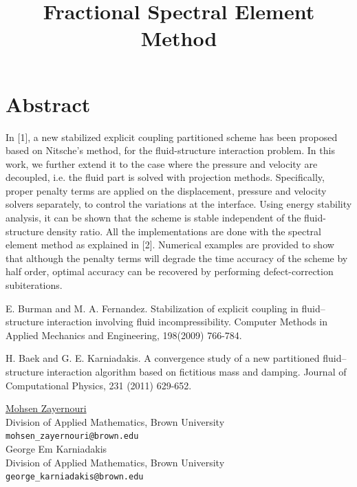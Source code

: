 \documentclass[article, A4, 11pt]{llncs}%
\begin{document}
\section*{Abstract}
In [1], a new stabilized explicit coupling partitioned scheme has been proposed based on Nitsche's method, for the fluid-structure interaction problem. In this work, we further extend it to the case where the pressure and velocity are decoupled, i.e. the fluid part is solved with projection methods. Specifically, proper penalty terms are applied on the displacement, pressure and velocity solvers separately, to control the variations at the interface. Using energy stability analysis, it can be shown that the scheme is stable independent of the fluid-structure density ratio. All the implementations are done with the spectral element method as explained in [2]. Numerical examples are provided to show that although the penalty terms will degrade the time accuracy of the scheme by half order, optimal accuracy can be recovered by performing defect-correction subiterations.


\begin{thebibliography}{10}
{\sc E. Burman and M. A. Fernandez}. {Stabilization of explicit coupling in fluid–structure interaction involving fluid incompressibility}. Computer Methods in Applied Mechanics and Engineering, 198(2009) 766-784.

{\sc H. Baek and G. E. Karniadakis}. {A convergence study of a new partitioned fluid–structure interaction algorithm based on fictitious mass and damping}. Journal of Computational Physics, 231 (2011) 629-652.
\end{thebibliography} %

\title{Fractional Spectral Element Method}
 \author{} \institute{}
\maketitle
\begin{center}
{\large \underline{Mohsen Zayernouri}}\\
Division of Applied Mathematics, Brown University\\
{\tt mohsen\_zayernouri@brown.edu}
\\ \vspace{4mm}
{\large George  Em Karniadakis}\\
Division of Applied Mathematics, Brown University\\
{\tt george\_karniadakis@brown.edu}
\end{center}
\end{document}
